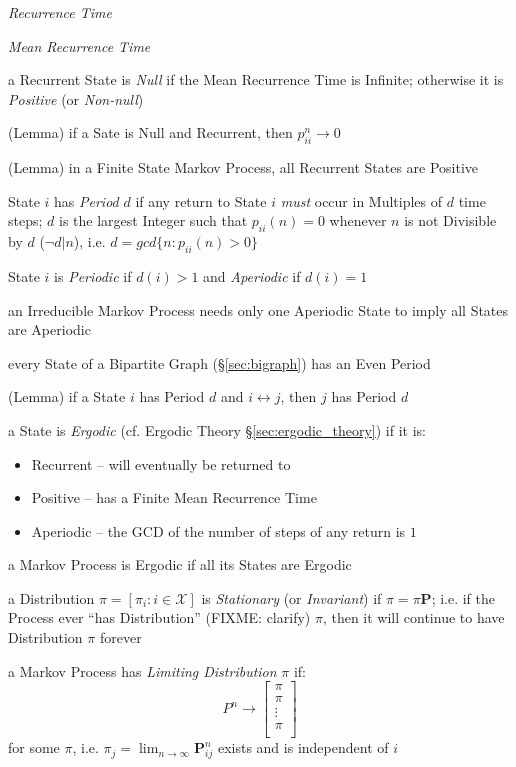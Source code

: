 \emph{Recurrence Time}

\emph{Mean Recurrence Time}

a Recurrent State is \emph{Null} if the Mean Recurrence Time is Infinite;
otherwise it is \emph{Positive} (or \emph{Non-null})

(Lemma) if a Sate is Null and Recurrent, then $p_{ii}^n \to 0$

(Lemma) in a Finite State Markov Process, all Recurrent States are Positive

State $i$ has \emph{Period} $d$ if any return to State $i$ \emph{must} occur in
Multiples of $d$ time steps; $d$ is the largest Integer such that
$p_{ii}(n) = 0$ whenever $n$ is not Divisible by $d$ ($\neg d | n$), i.e.
$d = gcd\{n : p_{ii}(n) > 0 \}$

State $i$ is \emph{Periodic} if $d(i) > 1$ and \emph{Aperiodic} if $d(i) = 1$

an Irreducible Markov Process needs only one Aperiodic State to imply all States
are Aperiodic

every State of a Bipartite Graph (\S\ref{sec:bigraph}) has an Even Period

(Lemma) if a State $i$ has Period $d$ and $i \leftrightarrow j$, then $j$ has
Period $d$

a State is \emph{Ergodic} (cf. Ergodic Theory \S\ref{sec:ergodic_theory}) if it
is:
\begin{itemize}
  \item Recurrent -- will eventually be returned to
  \item Positive -- has a Finite Mean Recurrence Time
  \item Aperiodic -- the GCD of the number of steps of any return is $1$
\end{itemize}
a Markov Process is Ergodic if all its States are Ergodic

a Distribution $\pi = [\pi_i : i \in \mathcal{X}]$ is \emph{Stationary} (or
\emph{Invariant}) if $\pi = \pi \mathbf{P}$; i.e. if the Process ever ``has
Distribution'' (FIXME: clarify) $\pi$, then it will continue to have
Distribution $\pi$ forever

a Markov Process has \emph{Limiting Distribution} $\pi$ if:
\[
  P^n \to \begin{bmatrix}
    \pi \\
    \pi \\
    \vdots \\
    \pi \\
  \end{bmatrix}
\]
for some $\pi$, i.e. $\pi_j = \lim_{n\to\infty} \mathbf{P}_{ij}^n$
exists and is independent of $i$

